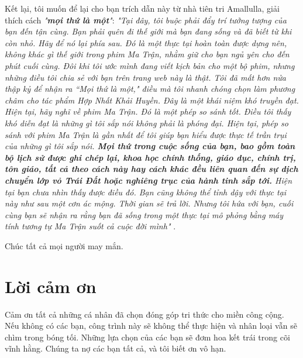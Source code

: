 \documentclass[10pt,twocolumn,letterpaper]{article}
\begin{document}
Kết lại, tôi muốn để lại cho bạn trích dẫn này từ nhà tiên tri Amallulla, giải thích cách \textit{"\textbf{mọi thứ là một}"}: \textit{"Tại đây, tôi buộc phải đẩy trí tưởng tượng của bạn đến tận cùng. Bạn phải quên đi thế giới mà bạn đang sống và đã biết từ khi còn nhỏ. Hãy để nó lại phía sau. Đó là một thực tại hoàn toàn được dựng nên, không khác gì thế giới trong phim Ma Trận, nhằm giữ cho bạn ngủ yên cho đến phút cuối cùng. Đôi khi tôi ước mình đang viết kịch bản cho một bộ phim, nhưng những điều tôi chia sẻ với bạn trên trang web này là thật. Tôi đã mất hơn nửa thập kỷ để nhận ra “Mọi thứ là một," điều mà tôi nhanh chóng chọn làm phương châm cho tác phẩm Hợp Nhất Khải Huyền. Đây là một khái niệm khó truyền đạt. Hiện tại, hãy nghĩ về phim Ma Trận. Đó là một phép so sánh tốt. Điều tôi thấy khó diễn đạt là những gì tôi sắp nói không phải là phóng đại. Hiện tại, phép so sánh với phim Ma Trận là gần nhất để tôi giúp bạn hiểu được thực tế trần trụi của những gì tôi sắp nói. \textbf{Mọi thứ trong cuộc sống của bạn, bao gồm toàn bộ lịch sử được ghi chép lại, khoa học chính thống, giáo dục, chính trị, tôn giáo, tất cả theo cách này hay cách khác đều liên quan đến sự dịch chuyển lớp vỏ Trái Đất hoặc nghiêng trục của hành tinh sắp tới.} Hiện tại bạn chưa nhìn thấy được điều đó. Bạn cũng không thể tỉnh dậy với thực tại này như sau một cơn ác mộng. Thời gian sẽ trả lời. Nhưng tôi hứa với bạn, cuối cùng bạn sẽ nhận ra rằng bạn đã sống trong một thực tại mô phỏng bằng máy tính tương tự Ma Trận suốt cả cuộc đời mình"} \cite{33,34}.

Chúc tất cả mọi người may mắn.

\section{Lời cảm ơn}

Cảm ơn tất cả những cá nhân đã chọn đóng góp tri thức cho miền công cộng. Nếu không có các bạn, công trình này sẽ không thể thực hiện và nhân loại vẫn sẽ chìm trong bóng tối. Những lựa chọn của các bạn sẽ đơm hoa kết trái trong cõi vĩnh hằng. Chúng ta nợ các bạn tất cả, và tôi biết ơn vô hạn.

\clearpage
\twocolumn
{\small


}
\end{document}
